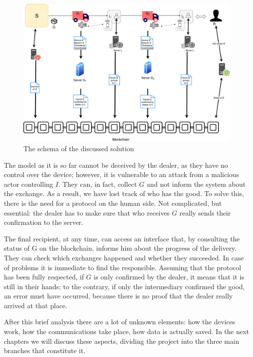 \begin{figure}[h]
    \centering
    \includegraphics[width=\textwidth]{figures/solution.pdf}
    \caption{The schema of the discussed solution}
    \label{fig:solution}
\end{figure}

The model as it is so far cannot be deceived by the dealer, as they have no control over the device; however, it is vulnerable to an attack from a malicious actor controlling $I$. They can, in fact, collect $G$ and not inform the system about the exchange. As a result, we have lost track of who has the good. To solve this, there is the need for a protocol on the human side. Not complicated, but essential: the dealer has to make sure that who receives $G$ really sends their confirmation to the server. 

The final recipient, at any time, can access an interface that, by consulting the status of G on the blockchain, informs him about the progress of the delivery. They can check which exchanges happened and whether they succeeded. In case of problems it is immediate to find the responsible. Assuming that the protocol has been fully respected, if $G$ is only confirmed by the dealer, it means that it is still in their hands; to the contrary, if only the intermediary confirmed the good, an error must have occurred, because there is no proof that the dealer really arrived at that place.

After this brief analysis there are a lot of unknown elements: how the devices work, how the communications take place, how data is actually saved. In the next chapters we will discuss these aspects, dividing the project into the three main branches that constitute it.



